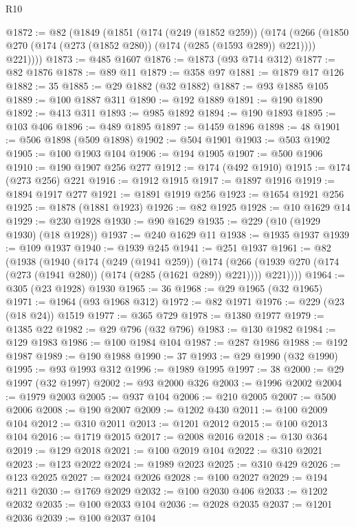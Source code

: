 \begin{lexlean}{R10}
\begin{coremodule}
@1872 := @82
    (@1849
      (@1851
        (@174
          (@249 (@1852 @259))
          (@174
            (@266 (@1850 @270 (@174 (@273 (@1852 @280)) (@174 (@285 (@1593 @289)) @221))))
            @221))))
@1873 := @485 @1607
@1876 := @1873 (@93 @714 @312)
@1877 := @82 @1876
@1878 := @89 @11
@1879 := @358 @97
@1881 := @1879 @17 @126
@1882 := 35
@1885 := @29 @1882 (@32 @1882)
@1887 := @93 @1885 @105
@1889 := @100 @1887 @311
@1890 := @192 @1889
@1891 := @190 @1890
@1892 := @413 @311
@1893 := @985 @1892
@1894 := @190 @1893
@1895 := @103 @406
@1896 := @489 @1895
@1897 := @1459 @1896
@1898 := 48
@1901 := @506 @1898 (@509 @1898)
@1902 := @504 @1901
@1903 := @503 @1902
@1905 := @100 @1903 @104
@1906 := @194 @1905
@1907 := @500 @1906
@1910 := @190 @1907 @256 @277
@1912 := @174 (@492 @1910)
@1915 := @174 (@273 @256) @221
@1916 := @1912 @1915
@1917 := @1897 @1916
@1919 := @1894 @1917 @277
@1921 := @1891 @1919 @256
@1923 := @1654 @1921 @256
@1925 := @1878 (@1881 @1923)
@1926 := @82 @1925
@1928 := @10 @1629 @14
@1929 := @230 @1928
@1930 := @90 @1629
@1935 := @229 (@10 (@1929 @1930) (@18 @1928))
@1937 := @240 @1629 @11
@1938 := @1935 @1937
@1939 := @109 @1937
@1940 := @1939 @245
@1941 := @251 @1937
@1961 := @82
    (@1938
      (@1940
        (@174
          (@249 (@1941 @259))
          (@174
            (@266 (@1939 @270 (@174 (@273 (@1941 @280)) (@174 (@285 (@1621 @289)) @221))))
            @221))))
@1964 := @305 (@23 @1928) @1930
@1965 := 36
@1968 := @29 @1965 (@32 @1965)
@1971 := @1964 (@93 @1968 @312)
@1972 := @82 @1971
@1976 := @229 (@23 (@18 @24)) @1519
@1977 := @365 @729
@1978 := @1380 @1977
@1979 := @1385 @22
@1982 := @29 @796 (@32 @796)
@1983 := @130 @1982
@1984 := @129 @1983
@1986 := @100 @1984 @104
@1987 := @287 @1986
@1988 := @192 @1987
@1989 := @190 @1988
@1990 := 37
@1993 := @29 @1990 (@32 @1990)
@1995 := @93 @1993 @312
@1996 := @1989 @1995
@1997 := 38
@2000 := @29 @1997 (@32 @1997)
@2002 := @93 @2000 @326
@2003 := @1996 @2002
@2004 := @1979 @2003
@2005 := @937 @104
@2006 := @210 @2005
@2007 := @500 @2006
@2008 := @190 @2007
@2009 := @1202 @430
@2011 := @100 @2009 @104
@2012 := @310 @2011
@2013 := @1201 @2012
@2015 := @100 @2013 @104
@2016 := @1719 @2015
@2017 := @2008 @2016
@2018 := @130 @364
@2019 := @129 @2018
@2021 := @100 @2019 @104
@2022 := @310 @2021
@2023 := @123 @2022
@2024 := @1989 @2023
@2025 := @310 @429
@2026 := @123 @2025
@2027 := @2024 @2026
@2028 := @100 @2027
@2029 := @194 @211
@2030 := @1769 @2029
@2032 := @100 @2030 @406
@2033 := @1202 @2032
@2035 := @100 @2033 @104
@2036 := @2028 @2035
@2037 := @1201 @2036
@2039 := @100 @2037 @104

\end{coremodule}
\end{lexlean}
